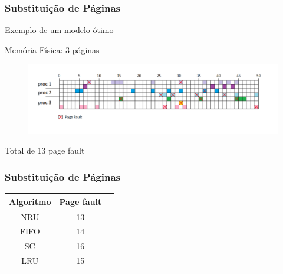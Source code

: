 \documentclass{beamer}
\begin{document}
\begin{frame}
\frametitle{Substituição de Páginas} 

Exemplo de um modelo ótimo

Memória Física: 3 páginas

\begin{figure}
\centering
\includegraphics[scale=0.4]{fimfim2.png}
\end{figure}

Total de 13 page fault

\justifying
\end{frame}


\begin{frame}
\frametitle{Substituição de Páginas} 

\begin{table}[h!]
  \begin{center}
   	\label{tab:table1}
    \begin{tabular}{ccc}
      \toprule
      Algoritmo & Page fault\\
      \midrule
      NRU & 13\\
      FIFO & 14\\
      SC & 16\\
      LRU & 15\\
            
      \bottomrule
    \end{tabular}
  \end{center}
\end{table}

\justifying
\end{frame}
\end{document}
